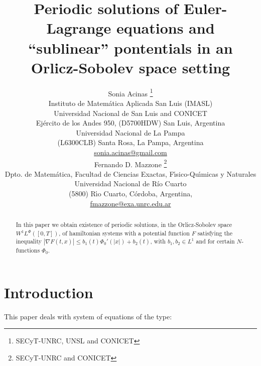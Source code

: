 \documentclass[twoside]{article}
\title{Periodic solutions of 
Euler-Lagrange equations and ``sublinear'' pontentials   in an Orlicz-Sobolev space setting }
\author{Sonia Acinas \thanks{SECyT-UNRC, UNSL and CONICET}\\
Instituto de Matem\'atica Aplicada San Luis (IMASL)\\ 
Universidad Nacional de San Luis and CONICET\\
Ej\'ercito de los Andes 950,
(D5700HDW) San Luis, Argentina\\
Universidad Nacional de La Pampa\\
(L6300CLB) Santa Rosa, La Pampa, Argentina\\
\url{sonia.acinas@gmail.com}\\[3mm]
Fernando D. Mazzone \thanks{SECyT-UNRC and CONICET}\\
Dpto. de Matem\'atica, Facultad de Ciencias Exactas, F\'{\i}sico-Qu\'{\i}micas y Naturales\\
Universidad Nacional de R\'{i}o Cuarto\\
(5800) R\'{\i}o Cuarto, C\'ordoba, Argentina,\\
\url{fmazzone@exa.unrc.edu.ar}
}
\date{}
\theoremstyle{remark}
\newcommand{\lphi}{L^{\Phi}}
\newcommand{\wphi}{W^{1}\lphi}
\renewcommand{\leq}{\leqslant}
\begin{document}
\maketitle
%
\begingroup%
    \renewcommand{\thefootnote}{}%
    \endgroup
%
%
%
%

\begin{abstract}

In this paper we obtain existence of periodic solutions, in the Orlicz-Sobolev space $\wphi([0,T])$, of hamiltonian systems with a potential  function $F$ satisfying the inequality  $|\nabla F(t,x)|\leq b_1(t) \Phi_0'(|x|)+b_2(t)$, with    $b_1, b_2\in L^1$ and for certain $N$-functions $\Phi_0$.

\end{abstract}




\pagestyle{fancy} \headheight 35pt \fancyhead{} \fancyfoot{}

\fancyfoot[C]{\thepage}  \fancyhead[CO]{\nouppercase{\section}}

\fancyhead[CO]{\nouppercase{\leftmark}}






\section{Introduction}
This paper deals with system  of equations of the type:
\end{document}
